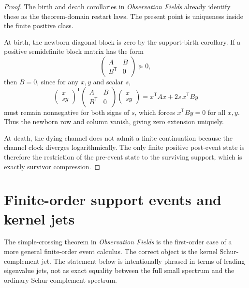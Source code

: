 \documentclass[11pt,a4paper]{article}
\numberwithin{equation}{section}
\theoremstyle{thmcompact}
\theoremstyle{remark}
\begin{document}
\begin{proof}
The birth and death corollaries in \emph{Observation Fields} already identify these as the theorem-domain restart laws. The present point is uniqueness inside the finite positive class.

At birth, the newborn diagonal block is zero by the support-birth corollary. If a positive semidefinite block matrix has the form
\[
\begin{pmatrix}
A & B\\
B^{\mathsf T} & 0
\end{pmatrix}\succeq 0,
\]
then $B=0$, since for any $x,y$ and scalar $s$,
\[
\begin{pmatrix}
x\\ sy
\end{pmatrix}^{\mathsf T}
\begin{pmatrix}
A & B\\
B^{\mathsf T} & 0
\end{pmatrix}
\begin{pmatrix}
x\\ sy
\end{pmatrix}
=
x^{\mathsf T}Ax + 2s\,x^{\mathsf T}By
\]
must remain nonnegative for both signs of $s$, which forces $x^{\mathsf T}By=0$ for all $x,y$. Thus the newborn row and column vanish, giving zero extension uniquely.

At death, the dying channel does not admit a finite continuation because the channel clock diverges logarithmically. The only finite positive post-event state is therefore the restriction of the pre-event state to the surviving support, which is exactly survivor compression.
\end{proof}

\section{Finite-order support events and kernel jets}

The simple-crossing theorem in \emph{Observation Fields} is the first-order case of a more general finite-order event calculus. The correct object is the kernel Schur-complement jet. The statement below is intentionally phrased in terms of leading eigenvalue jets, not as exact equality between the full small spectrum and the ordinary Schur-complement spectrum.
\end{document}
